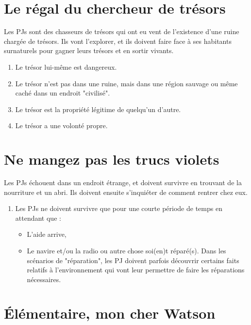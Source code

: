 \begin{multicols}{2}
\section{Le régal du chercheur de trésors}
\hypertarget{tresor}{}


Les PJs sont des chasseurs de trésors qui ont eu vent de l'existence d'une ruine chargée de trésors. Ils vont l'explorer, et ils doivent faire face à ses habitants surnaturels pour gagner leurs trésors et en sortir vivants.

\themes
\begin{enumerate}
\item Le trésor lui-même est dangereux.
\item Le trésor n'est pas dans une ruine, mais dans une région sauvage ou même caché dans un endroit "civilisé".
\item Le trésor est la propriété légitime de quelqu'un d'autre.
\item Le trésor a une volonté propre.
\end{enumerate}

\section{Ne mangez pas les trucs violets}
\hypertarget{violet}{}


Les PJs échouent dans un endroit étrange, et doivent survivre en trouvant de la nourriture et un abri. Ils doivent ensuite s'inquiéter de comment rentrer chez eux.

\themes
\begin{enumerate}
\item Les PJs ne doivent survivre que pour une courte période de temps en attendant que :
\begin{itemize}
\item L'aide arrive,
\item Le navire et/ou la radio ou autre chose soi(en)t réparé(s). Dans les scénarios de "réparation", les PJ doivent parfois découvrir certains faits relatifs à l'environnement qui vont leur permettre de faire les réparations nécessaires.
\end{itemize}
\end{enumerate}

\section{Élémentaire, mon cher Watson}
\hypertarget{watson}{}


\end{multicols}
